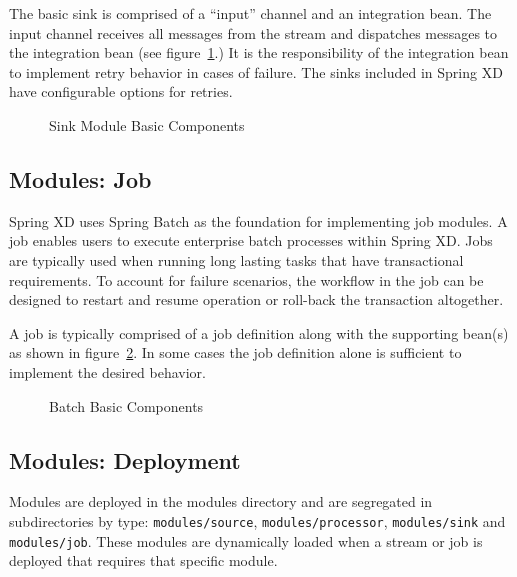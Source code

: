 \par

The basic sink is comprised of a ``input'' channel and an integration bean.
The input channel receives all messages from the stream and dispatches
messages to the integration bean (see figure~\ref{fig:sinkmbc}.) It is the responsibility 
of the integration bean to implement retry behavior in cases of failure. The sinks 
included in Spring XD have configurable options for retries.

\par

\begin{figure}
\centering
{}
\caption{Sink Module Basic Components}
\label{fig:sinkmbc}
\end{figure}

\par

\subsection{Modules: Job}
Spring XD uses Spring Batch \cite{spring-batch-reference} as the foundation for implementing
job modules. A job enables users to execute enterprise batch processes within Spring XD.
Jobs are typically used when running long lasting tasks that have transactional requirements.
To account for failure scenarios, the workflow in the job can be designed to restart and 
resume operation or roll-back the transaction altogether.

\par

A job is typically comprised of a job definition along with the supporting
bean(s) as shown in figure~\ref{fig:batchmbc}.
In some cases the job definition alone is sufficient to implement the desired behavior.

\par

\begin{figure}
\centering
{}
\caption{Batch Basic Components}
\label{fig:batchmbc}
\end{figure}

\subsection{Modules: Deployment}
Modules are deployed in the modules directory and are segregated in
subdirectories by type: \texttt{modules/source}, \texttt{modules/processor}, 
\texttt{modules/sink} and \texttt{modules/job}.
These modules are dynamically loaded when a stream or job is deployed that requires that
specific module.

